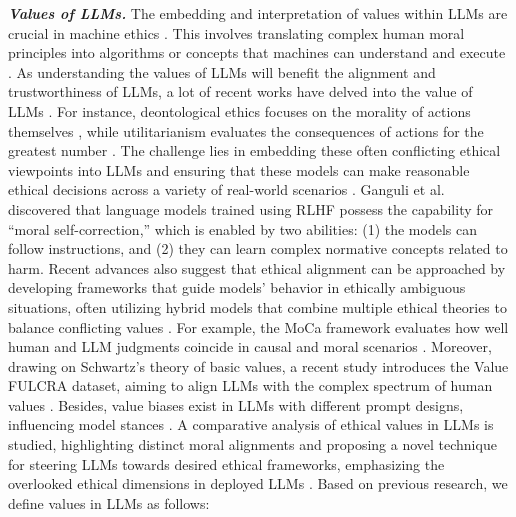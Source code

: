 \textit{\textbf{Values of LLMs.}} The embedding and interpretation of values within LLMs are crucial in machine ethics \cite{yi2023unpacking, schwartz2005schwartz}. This involves translating complex human moral principles into algorithms or concepts that machines can understand and execute \cite{hendrycks2020aligning, kang2023values}. As understanding the values of LLMs will benefit the alignment and trustworthiness of LLMs, a lot of recent works have delved into the value of LLMs \cite{pickering2023deontological, sebo2023rebugnant, deng2024deconstructing, wang2023decodingtrust, huang2024position, ganguli2023capacity, liu2023trustworthy, liu2024largelanguagemodelscausal, almeida2024exploring, sam2024comparative}. For instance, deontological ethics focuses on the morality of actions themselves \cite{pickering2023deontological}, while utilitarianism evaluates the consequences of actions for the greatest number \cite{sebo2023rebugnant}. The challenge lies in embedding these often conflicting ethical viewpoints into LLMs and ensuring that these models can make reasonable ethical decisions across a variety of real-world scenarios \cite{deng2024deconstructing}. Ganguli et al. \cite{ganguli2023capacity} discovered that language models trained using RLHF \cite{rlhf} possess the capability for ``moral self-correction,'' which is enabled by two abilities: (1) the models can follow instructions, and (2) they can learn complex normative concepts related to harm. Recent advances also suggest that ethical alignment can be approached by developing frameworks that guide models' behavior in ethically ambiguous situations, often utilizing hybrid models that combine multiple ethical theories to balance conflicting values \cite{nie2023moca, yao2023value, yi2023unpacking, zhao2023competeai}. For example, the MoCa framework evaluates how well human and LLM judgments coincide in causal and moral scenarios \cite{nie2023moca}. Moreover, drawing on Schwartz's theory of basic values, a recent study introduces the Value FULCRA dataset, aiming to align LLMs with the complex spectrum of human values \cite{yao2023value}. Besides, value biases exist in LLMs with different prompt designs, influencing model stances \cite{wright2024revealing}. A comparative analysis of ethical values in LLMs is studied, highlighting distinct moral alignments and proposing a novel technique for steering LLMs towards desired ethical frameworks, emphasizing the overlooked ethical dimensions in deployed LLMs \cite{tlaie2024exploring}. Based on previous research, we define values in LLMs as follows:

